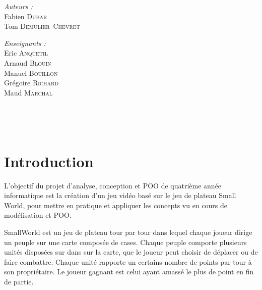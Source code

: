 \documentclass[a4paper]{article}%
\begin{document}
\begin{titlepage}
\begin{center}
\begin{minipage}{0.4\textwidth}
\begin{flushleft} \large
\emph{Auteurs :}\\
Fabien \textsc{Dubar}\\
Tom \textsc{Demulier--Chevret}\\
\end{flushleft}
\end{minipage}
\begin{minipage}{0.4\textwidth}
\begin{flushright} \large
\emph{Enseignants :} \\
Eric \textsc{Anquetil}\\
Arnaud \textsc{Blouin}\\
Manuel \textsc{Bouillon}\\
Grégoire \textsc{Richard}\\
Maud \textsc{Marchal}\\
\end{flushright}
\end{minipage}

\vfill


\end{center}
\end{titlepage}


\newpage

~
\newpage

\tableofcontents

\newpage
~
\newpage

\section*{Introduction}

L'objectif du projet d'analyse, conception et POO de quatrième année informatique est la création d'un jeu vidéo basé sur le jeu de plateau Small World, pour mettre en pratique et appliquer les concepts vu en cours de modélisation et POO.

\medskip

SmallWorld est un jeu de plateau tour par tour dans lequel chaque joueur dirige un peuple sur une carte composée de cases. Chaque peuple comporte plusieurs unités disposées sur dans sur la carte, que le joueur peut choisir de déplacer ou de faire combattre.
Chaque unité rapporte un certains nombre de points par tour à son propriétaire. 
Le joueur gagnant est celui ayant amassé le plus de point en fin de partie.
\end{document}
